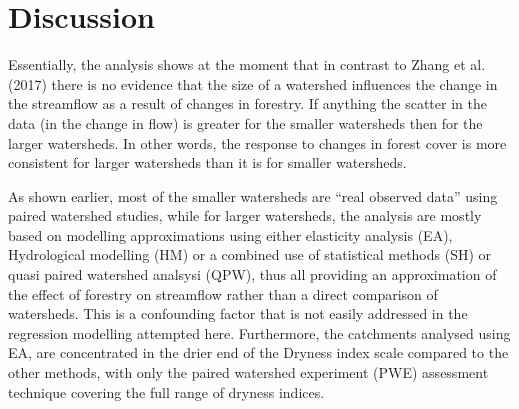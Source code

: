\documentclass[]{elsarticle} %
\newenvironment{Shaded}{\begin{snugshade}}{\end{snugshade}}
\newcommand{\DataTypeTok}[1]{\textcolor[rgb]{0.13,0.29,0.53}{#1}}
\newcommand{\DecValTok}[1]{\textcolor[rgb]{0.00,0.00,0.81}{#1}}
\newcommand{\KeywordTok}[1]{\textcolor[rgb]{0.13,0.29,0.53}{\textbf{#1}}}
\newcommand{\NormalTok}[1]{#1}
\newcommand{\OperatorTok}[1]{\textcolor[rgb]{0.81,0.36,0.00}{\textbf{#1}}}
\newcommand{\StringTok}[1]{\textcolor[rgb]{0.31,0.60,0.02}{#1}}
\begin{document}
\begin{Shaded}
\end{Shaded}

\begin{Shaded}
\end{Shaded}

\hypertarget{discussion}{%
\section{Discussion}\label{discussion}}

Essentially, the analysis shows at the moment that in contrast to Zhang
et al. (2017) there is no evidence that the size of a watershed
influences the change in the streamflow as a result of changes in
forestry. If anything the scatter in the data (in the change in flow) is
greater for the smaller watersheds then for the larger watersheds. In
other words, the response to changes in forest cover is more consistent
for larger watersheds than it is for smaller watersheds.

As shown earlier, most of the smaller watersheds are ``real observed
data'' using paired watershed studies, while for larger watersheds, the
analysis are mostly based on modelling approximations using either
elasticity analysis (EA), Hydrological modelling (HM) or a combined use
of statistical methods (SH) or quasi paired watershed analsysi (QPW),
thus all providing an approximation of the effect of forestry on
streamflow rather than a direct comparison of watersheds. This is a
confounding factor that is not easily addressed in the regression
modelling attempted here. Furthermore, the catchments analysed using EA,
are concentrated in the drier end of the Dryness index scale compared to
the other methods, with only the paired watershed experiment (PWE)
assessment technique covering the full range of dryness indices.
\end{document}
